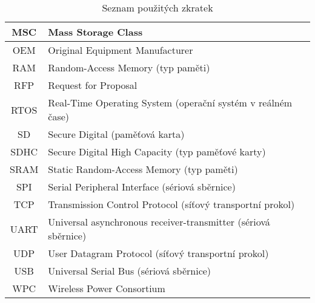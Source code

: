 \begin{table}[h]
\begin{tabular}{|c|l|}
MSC              & Mass Storage Class                                               \\ \hline
OEM              & Original Equipment Manufacturer                                  \\ \hline
RAM              & Random-Access Memory (typ paměti)                                \\ \hline
RFP              & Request for Proposal                                             \\ \hline
RTOS             & Real-Time Operating System (operační systém v reálném čase)      \\ \hline
SD               & Secure Digital (paměťová karta)                                  \\ \hline
SDHC             & Secure Digital High Capacity (typ paměťové karty)                \\ \hline
SRAM             & Static Random-Access Memory (typ paměti)                         \\ \hline
SPI              & Serial Peripheral Interface (sériová sběrnice)                   \\ \hline
TCP              & Transmission Control Protocol (síťový transportní prokol)        \\ \hline
UART             & Universal asynchronous receiver-transmitter (sériová sběrnice)   \\ \hline
UDP              & User Datagram Protocol (síťový transportní prokol)               \\ \hline
USB              & Universal Serial Bus (sériová sběrnice)                          \\ \hline
WPC              & Wireless Power Consortium                                        \\ \hline

\end{tabular}
\caption{Seznam použitých zkratek}
\label{tab:zkratky}
\end{table}